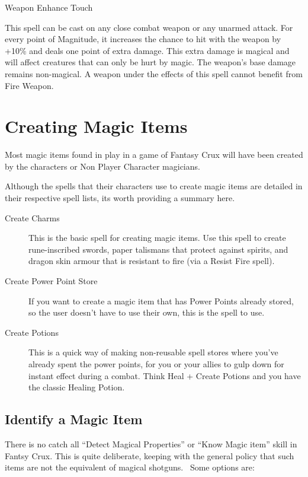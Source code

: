 \begin{rpg-spell}
{Weapon Enhance}
{Touch}

This spell can be cast on any close combat weapon or any unarmed attack. For every point of Magnitude, it increases the chance to hit with the weapon by +10\% and deals one point of extra damage. This extra damage is magical and will affect creatures that can only be hurt by magic. The weapon’s base damage remains non-magical. A weapon under the effects of this spell cannot benefit from Fire Weapon.
\end{rpg-spell}


\section{Creating Magic Items}

Most magic items found in play in a game of Fantasy Crux will have been created by the characters or Non Player Character magicians.

Although the spells that their characters use to create magic items are detailed in their respective spell lists, its worth providing a summary here.

\begin{description}
\item [Create Charms] This is the basic spell for creating magic items. Use this spell to create rune-inscribed swords, paper talismans that protect against spirits, and dragon skin armour that is resistant to fire (via a Resist Fire spell).
\item [Create Power Point Store] If you want to create a magic item that has Power Points already stored, so the user doesn’t have to use their own, this is the spell to use.
\item [Create Potions] This is a quick way of making non-reusable spell stores where you’ve already spent the power points, for you or your allies to gulp down for instant effect during a combat. Think Heal + Create Potions and you have the classic Healing Potion.
\end{description}

\subsection{Identify a Magic Item}
There is no catch all “Detect Magical Properties” or “Know Magic item” skill in Fantsy Crux. This is quite deliberate, keeping with the general policy that such items are not the equivalent of magical shotguns.  Some options are:

